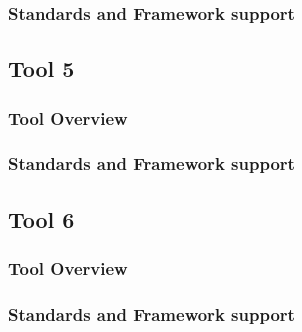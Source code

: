 \subsubsection{Standards and Framework support}

\subsection{Tool 5}
\subsubsection{Tool Overview}

\subsubsection{Standards and Framework support}

\subsection{Tool 6}
\subsubsection{Tool Overview}

\subsubsection{Standards and Framework support}
